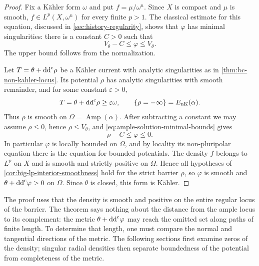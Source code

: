 \begin{proof}
Fix a K\"ahler form $\omega$ and put $f=\mu/\omega^n$. Since $X$ is compact and $\mu$ is smooth, $f\in L^p(X,\omega^n)$ for every
finite $p>1$. The classical estimate for this equation, discussed in \cref{sec:history-regularity}, shows that $\varphi$ has minimal singularities: there is a constant $C>0$ such that
\begin{equation}\label{eq:ample-solution-minimal-bounds}
 V_\theta-C\leq\varphi\leq V_\theta.
\end{equation}
The upper bound follows from the normalization.

Let $T=\theta+\mathrm{dd}^{\mathrm{c}}\rho$ be a K\"ahler current with analytic singularities as in \cref{thm:bc-non-kahler-locus}. Its potential $\rho$ has analytic singularities with smooth remainder, and for some constant $\varepsilon>0$,
\[
 T=\theta+\mathrm{dd}^{\mathrm{c}}\rho\geq\varepsilon\omega,
 \qquad \{\rho=-\infty\}=E_{\mathrm{nK}}(\alpha).
\]
Thus $\rho$ is smooth on
$\Omega=\operatorname{Amp}(\alpha)$. After subtracting a constant we may assume
$\rho\leq0$, hence $\rho\leq V_\theta$, and
\eqref{eq:ample-solution-minimal-bounds} gives
\[
 \rho-C\leq\varphi\leq0.
\]
In particular $\varphi$ is locally bounded on $\Omega$, and by locality its non-pluripolar equation there is the equation for bounded potentials. The density $f$ belongs to $L^p$ on $X$ and is smooth and strictly positive on $\Omega$. Hence all hypotheses of \cref{cor:big-lp-interior-smoothness} hold for the strict barrier $\rho$, so $\varphi$ is smooth and $\theta+\mathrm{dd}^{\mathrm{c}}\varphi>0$ on $\Omega$. Since $\theta$ is closed, this form is K\"ahler.
\end{proof}

The proof uses that the density is smooth and positive on the entire regular locus of the barrier. The theorem says nothing about the distance from the ample locus to its complement: the metric $\theta+\mathrm{dd}^{\mathrm{c}}\varphi$ may reach the omitted set along paths of finite length. To determine that length, one must compare the normal and tangential directions of the metric. The following sections first examine zeros of the density; singular radial densities then separate boundedness of the potential from completeness of the metric.
